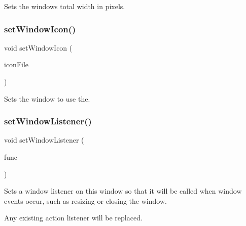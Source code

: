 Sets the window\textquotesingle{}s total width in pixels. 

\mbox{\label{classsgl_1_1GWindow_ab21f6abd314b7ffd3ccf7b6e18ac18cb}} 
\subsubsection{\texorpdfstring{set\+Window\+Icon()}{setWindowIcon()}}
{\footnotesize\ttfamily void set\+Window\+Icon (\begin{DoxyParamCaption}\item[{const std\+::string \&}]{icon\+File }\end{DoxyParamCaption})\hspace{0.3cm}{\ttfamily [virtual]}}



Sets the window to use the. 

\mbox{\label{classsgl_1_1GWindow_adbb687462d07ac5bd49f3861e4356838}} 
\subsubsection{\texorpdfstring{set\+Window\+Listener()}{setWindowListener()}\hspace{0.1cm}{\footnotesize\ttfamily [1/2]}}
{\footnotesize\ttfamily void set\+Window\+Listener (\begin{DoxyParamCaption}\item[{\mbox{\hyperlink{namespacesgl_ae9f3e9eab70035da1a2b114e21357b25}{G\+Event\+Listener}}}]{func }\end{DoxyParamCaption})\hspace{0.3cm}{\ttfamily [virtual]}}



Sets a window listener on this window so that it will be called when window events occur, such as resizing or closing the window. 

Any existing action listener will be replaced. \mbox{\label{classsgl_1_1GWindow_a58b90463b205519917d5f68bdf068815}} 

